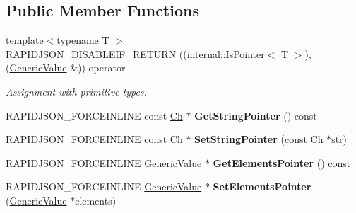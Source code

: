 \subsection*{Public Member Functions}
\begin{DoxyCompactItemize}
\item 
{\footnotesize template$<$typename T $>$ }\\\hyperlink{class_generic_value_a4a4418a93777942e1fb7ea71f8aaf680}{R\+A\+P\+I\+D\+J\+S\+O\+N\+\_\+\+D\+I\+S\+A\+B\+L\+E\+I\+F\+\_\+\+R\+E\+T\+U\+RN} ((internal\+::\+Is\+Pointer$<$ T $>$),(\hyperlink{class_generic_value}{Generic\+Value} \&)) operator
\begin{DoxyCompactList}\small\item\em Assignment with primitive types. \end{DoxyCompactList}\item 
\mbox{\label{class_generic_value_a0f54466a07c496300b15987e1b1915f8}} 
R\+A\+P\+I\+D\+J\+S\+O\+N\+\_\+\+F\+O\+R\+C\+E\+I\+N\+L\+I\+NE const \hyperlink{class_generic_value_ade0e0ce64ccd5d852da57a35e720bafb}{Ch} $\ast$ {\bfseries Get\+String\+Pointer} () const
\item 
\mbox{\label{class_generic_value_aa3d65011422b4aba50bf035b21a522e1}} 
R\+A\+P\+I\+D\+J\+S\+O\+N\+\_\+\+F\+O\+R\+C\+E\+I\+N\+L\+I\+NE const \hyperlink{class_generic_value_ade0e0ce64ccd5d852da57a35e720bafb}{Ch} $\ast$ {\bfseries Set\+String\+Pointer} (const \hyperlink{class_generic_value_ade0e0ce64ccd5d852da57a35e720bafb}{Ch} $\ast$str)
\item 
\mbox{\label{class_generic_value_aea7b87806555825ab36ebaaff57440bf}} 
R\+A\+P\+I\+D\+J\+S\+O\+N\+\_\+\+F\+O\+R\+C\+E\+I\+N\+L\+I\+NE \hyperlink{class_generic_value}{Generic\+Value} $\ast$ {\bfseries Get\+Elements\+Pointer} () const
\item 
\mbox{\label{class_generic_value_ad8ac8518160251babea5065f9eea8982}} 
R\+A\+P\+I\+D\+J\+S\+O\+N\+\_\+\+F\+O\+R\+C\+E\+I\+N\+L\+I\+NE \hyperlink{class_generic_value}{Generic\+Value} $\ast$ {\bfseries Set\+Elements\+Pointer} (\hyperlink{class_generic_value}{Generic\+Value} $\ast$elements)
\item 
\mbox{\label{class_generic_value_a04412a15687feb103f917cdd91b32298}} 

\end{DoxyCompactItemize}
